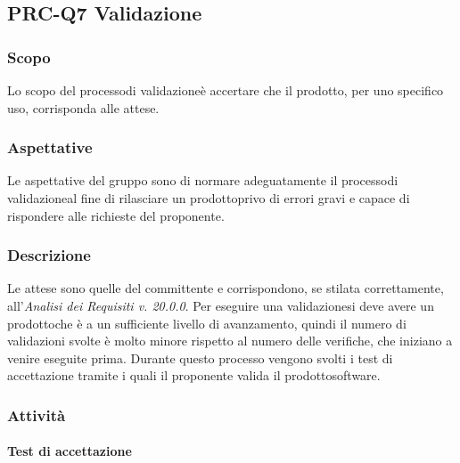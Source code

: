 \subsection{PRC-Q7 Validazione}

\subsubsection{Scopo}
Lo scopo del processo\glosp di validazione\glosp è accertare che il prodotto\glo, per uno specifico uso, corrisponda alle attese.

\subsubsection{Aspettative}
Le aspettative del gruppo sono di normare adeguatamente il processo\glosp di validazione\glosp al fine di rilasciare un prodotto\glosp privo di errori gravi e capace di rispondere alle richieste del proponente.

\subsubsection{Descrizione}
Le attese sono quelle del committente e corrispondono, se stilata correttamente, all'\textit{Analisi dei Requisiti v. 20.0.0}. 
Per eseguire una validazione\glosp si deve avere un prodotto\glosp che è a un sufficiente livello di avanzamento, quindi il numero di validazioni svolte è molto minore rispetto al numero delle verifiche, che iniziano a venire eseguite prima.
Durante questo processo vengono svolti i test di accettazione tramite i quali il proponente valida il prodotto\glosp software.

\subsubsection{Attività}
	\paragraph{Test di accettazione}
